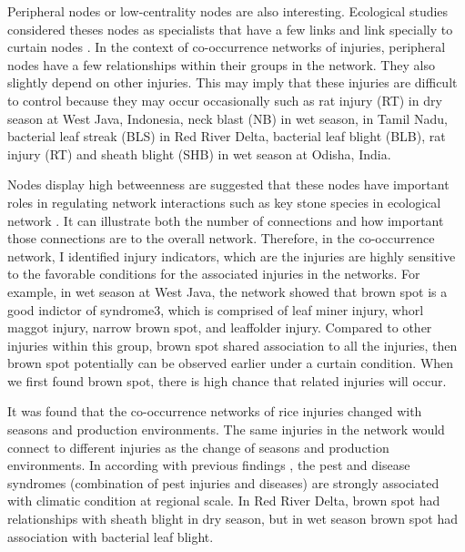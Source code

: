Peripheral nodes or low-centrality nodes are also interesting. Ecological studies considered theses nodes as specialists that have a few links and link specially to curtain nodes \citep{Lu_2013_Soil, Borthagaray_2014_Inferring}. In the context of co-occurrence networks of injuries, peripheral nodes have a few relationships within their groups in the network. They also slightly depend on other injuries. This may imply that these injuries are difficult to control because they may occur occasionally such as rat injury (RT) in dry season at West Java, Indonesia, neck blast (NB) in wet season, in Tamil Nadu, bacterial leaf streak (BLS) in Red River Delta, bacterial leaf blight (BLB), rat injury (RT) and sheath blight (SHB) in wet season at Odisha, India.

Nodes display high betweenness are suggested that these nodes have important roles in regulating network interactions such as key stone species in ecological network \cite{Wright_2012_Microbial}. It can illustrate both the number of connections and how important those connections are to the overall network. Therefore, in the co-occurrence network, I identified injury indicators, which are the injuries are highly sensitive to the favorable conditions for the associated injuries in the networks. For example, in wet season at West Java, the network showed that brown spot is a good indictor of syndrome3, which is comprised of leaf miner injury, whorl maggot injury, narrow brown spot, and leaffolder injury. Compared to other injuries within this group, brown spot shared association to all the injuries, then brown spot potentially can be observed earlier under a curtain condition. When we first found brown spot, there is high chance that related injuries will occur. 

It was found that the co-occurrence networks of rice injuries changed with seasons and production environments. The same injuries in the network would connect to different injuries as the change of seasons and production environments. In according with previous findings \citep{Savary_2000_Characterization, Avelino_2006_Intensity, Savary_2012_Review} , the pest and disease syndromes (combination of pest injuries and diseases) are strongly associated with climatic condition at regional scale. In Red River Delta, brown spot had relationships with sheath blight in dry season, but in wet season brown spot had association with bacterial leaf blight. 
  
